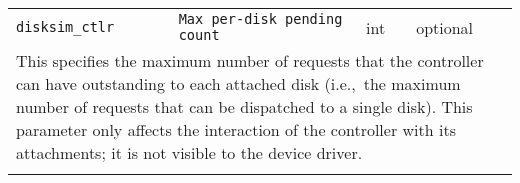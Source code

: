 \begin{tabular}{|p{\lpmodwidth}|p{\lpnamewidth}|p{0.5in}|p{0.5in}|}
\cline{1-4}
\texttt{disksim\_ctlr} & \texttt{Max per-disk pending count} & int & optional \\ 
\cline{1-4}
\multicolumn{4}{|p{6in}|}{
This specifies the maximum number of requests that the controller can
have outstanding to each attached disk (i.e.,~the maximum number of
requests that can be dispatched to a single disk). This parameter
only affects the interaction of the controller with its attachments;
it is not visible to the device driver.
}\\ 
\cline{1-4}
\multicolumn{4}{p{5in}}{}\\
\end{tabular}\\ 
